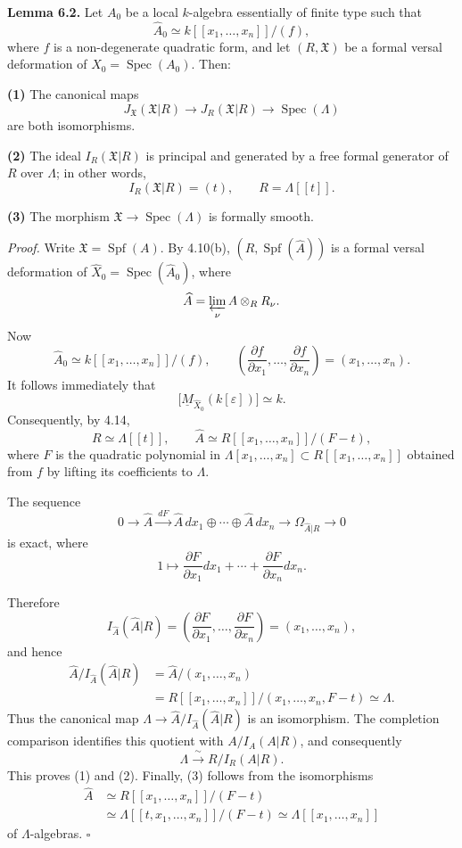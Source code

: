 \par\medskip
\noindent\textbf{Lemma 6.2.}
Let $A_0$ be a local $k$-algebra essentially of finite type such that
\[
\widehat A_0\simeq k[[x_1,\ldots,x_n]]/(f),
\]
where $f$ is a non-degenerate quadratic form, and let
$(R,\mathfrak X)$ be a formal versal deformation of
$X_0=\operatorname{Spec}(A_0)$. Then:

\smallskip
\noindent\textbf{(1)} The canonical maps
\[
J_{\mathfrak X}(\mathfrak X|R)
 \longrightarrow J_R(\mathfrak X|R)
 \longrightarrow \operatorname{Spec}(\Lambda)
\]
are both isomorphisms.

\smallskip
\noindent\textbf{(2)} The ideal
$I_R(\mathfrak X|R)$ is principal and generated by a free formal
generator of $R$ over $\Lambda$; in other words,
\[
I_R(\mathfrak X|R)=(t),
\qquad R=\Lambda[[t]].
\]

\smallskip
\noindent\textbf{(3)} The morphism
$\mathfrak X\longrightarrow\operatorname{Spec}(\Lambda)$ is formally
smooth.

\smallskip
\noindent\textit{Proof.}
Write $\mathfrak X=\operatorname{Spf}(A)$. By 4.10(b),
$(R,\operatorname{Spf}(\widehat A))$ is a formal versal deformation
of $\widehat X_0=\operatorname{Spec}(\widehat A_0)$, where
\[
\widehat A=\varprojlim_\nu A\otimes_RR_\nu.
\]
Now
\[
\widehat A_0\simeq k[[x_1,\ldots,x_n]]/(f),
\qquad
\left(\frac{\partial f}{\partial x_1},\ldots,
      \frac{\partial f}{\partial x_n}\right)
=(x_1,\ldots,x_n).
\]
It follows immediately that
\[
\bigl[\underline M_{\widehat X_0}(k[\varepsilon])\bigr]
\simeq k.
\]
Consequently, by 4.14,
\[
R\simeq\Lambda[[t]],
\qquad
\widehat A\simeq R[[x_1,\ldots,x_n]]/(F-t),
\]
where $F$ is the quadratic polynomial in
$\Lambda[x_1,\ldots,x_n]\subset R[[x_1,\ldots,x_n]]$ obtained from
$f$ by lifting its coefficients to $\Lambda$.

The sequence
\[
0\longrightarrow\widehat A
 \xrightarrow{\ dF\ }
 \widehat A\,dx_1\oplus\cdots\oplus\widehat A\,dx_n
 \longrightarrow\Omega_{\widehat A|R}\longrightarrow0
\]
is exact, where
\[
1\longmapsto
 \frac{\partial F}{\partial x_1}dx_1+\cdots+
 \frac{\partial F}{\partial x_n}dx_n.
\]


Therefore
\[
I_{\widehat A}(\widehat A|R)
=\left(\frac{\partial F}{\partial x_1},\ldots,
       \frac{\partial F}{\partial x_n}\right)
=(x_1,\ldots,x_n),
\]
and hence
\[
\begin{aligned}
\widehat A/I_{\widehat A}(\widehat A|R)
&=\widehat A/(x_1,\ldots,x_n)\\
&=R[[x_1,\ldots,x_n]]/(x_1,\ldots,x_n,F-t)
 \simeq\Lambda.
\end{aligned}
\]
Thus the canonical map
$\Lambda\longrightarrow
\widehat A/I_{\widehat A}(\widehat A|R)$ is an isomorphism. The
completion comparison identifies this quotient with
$A/I_A(A|R)$, and consequently
\[
\Lambda\xrightarrow{\ \sim\ }R/I_R(A|R).
\]
This proves (1) and (2). Finally, (3) follows from the isomorphisms
\[
\begin{aligned}
\widehat A
&\simeq R[[x_1,\ldots,x_n]]/(F-t)\\
&\simeq\Lambda[[t,x_1,\ldots,x_n]]/(F-t)
 \simeq\Lambda[[x_1,\ldots,x_n]]
\end{aligned}
\]
of $\Lambda$-algebras.
\hfill$\square$

